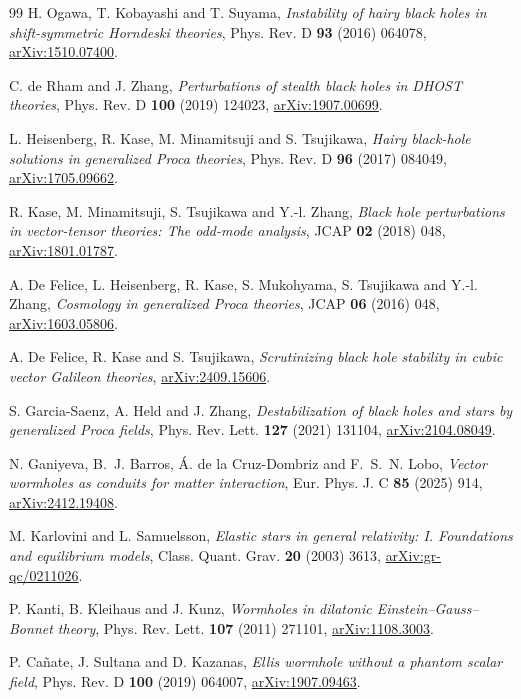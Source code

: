 \documentclass[11pt,a4paper]{article}
\theoremstyle{remark}
\begin{document}
\begin{thebibliography}{99}
 H. Ogawa, T. Kobayashi and T. Suyama, \emph{Instability of hairy black holes in shift-symmetric Horndeski theories}, Phys. Rev. D \textbf{93} (2016) 064078, \href{https://arxiv.org/abs/1510.07400}{arXiv:1510.07400}.

 C. de Rham and J. Zhang, \emph{Perturbations of stealth black holes in DHOST theories}, Phys. Rev. D \textbf{100} (2019) 124023, \href{https://arxiv.org/abs/1907.00699}{arXiv:1907.00699}.

 L. Heisenberg, R. Kase, M. Minamitsuji and S. Tsujikawa, \emph{Hairy black-hole solutions in generalized Proca theories}, Phys. Rev. D \textbf{96} (2017) 084049, \href{https://arxiv.org/abs/1705.09662}{arXiv:1705.09662}.

 R. Kase, M. Minamitsuji, S. Tsujikawa and Y.-l. Zhang, \emph{Black hole perturbations in vector-tensor theories: The odd-mode analysis}, JCAP \textbf{02} (2018) 048, \href{https://arxiv.org/abs/1801.01787}{arXiv:1801.01787}.

 A. De Felice, L. Heisenberg, R. Kase, S. Mukohyama, S. Tsujikawa and Y.-l. Zhang, \emph{Cosmology in generalized Proca theories}, JCAP \textbf{06} (2016) 048, \href{https://arxiv.org/abs/1603.05806}{arXiv:1603.05806}.

 A. De Felice, R. Kase and S. Tsujikawa, \emph{Scrutinizing black hole stability in cubic vector Galileon theories}, \href{https://arxiv.org/abs/2409.15606}{arXiv:2409.15606}.

 S. Garcia-Saenz, A. Held and J. Zhang, \emph{Destabilization of black holes and stars by generalized Proca fields}, Phys. Rev. Lett. \textbf{127} (2021) 131104, \href{https://arxiv.org/abs/2104.08049}{arXiv:2104.08049}.

 N. Ganiyeva, B.~J. Barros, Á. de la Cruz-Dombriz and F.~S.~N. Lobo, \emph{Vector wormholes as conduits for matter interaction}, Eur. Phys. J. C \textbf{85} (2025) 914, \href{https://arxiv.org/abs/2412.19408}{arXiv:2412.19408}.

 M. Karlovini and L. Samuelsson, \emph{Elastic stars in general relativity: I. Foundations and equilibrium models}, Class. Quant. Grav. \textbf{20} (2003) 3613, \href{https://arxiv.org/abs/gr-qc/0211026}{arXiv:gr-qc/0211026}.

 P. Kanti, B. Kleihaus and J. Kunz, \emph{Wormholes in dilatonic Einstein--Gauss--Bonnet theory}, Phys. Rev. Lett. \textbf{107} (2011) 271101, \href{https://arxiv.org/abs/1108.3003}{arXiv:1108.3003}.

 P. Cañate, J. Sultana and D. Kazanas, \emph{Ellis wormhole without a phantom scalar field}, Phys. Rev. D \textbf{100} (2019) 064007, \href{https://arxiv.org/abs/1907.09463}{arXiv:1907.09463}.

\end{thebibliography}
\end{document}
